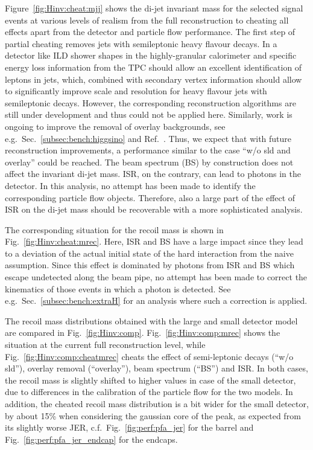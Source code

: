 Figure~\ref{fig:Hinv:cheat:mjj} shows the di-jet invariant mass for the selected signal events at various levels of realism from the full reconstruction to cheating all effects apart from the detector and particle flow performance. The first step of partial cheating removes jets with semileptonic heavy flavour decays. In a detector like ILD shower shapes in the highly-granular calorimeter and specific energy loss information from the TPC should allow an
excellent identification of leptons in jets, which, combined with secondary vertex information
should allow to significantly improve scale and resolution for heavy flavour jets with semileptonic decays. However, the corresponding reconstruction algorithms are still under development and thus could not be applied here. Similarly, work is ongoing to improve the
removal of overlay backgrounds, see e.g.\ Sec.~\ref{subsec:bench:higgsino} and Ref.~\cite{Boronat:2014hva}. Thus, we expect that with future reconstruction improvements, a performance similar to the case ``w/o sld and overlay'' could be reached. The beam spectrum (BS) by construction does not affect the invariant di-jet mass. ISR, on the contrary, can lead to photons in the detector. In this analysis, no attempt has been made to identify the corresponding particle flow objects. Therefore, also a large part of the effect of ISR on the di-jet mass should be recoverable with a more sophisticated analysis. 

The corresponding situation for the recoil mass is shown in Fig.~\ref{fig:Hinv:cheat:mrec}.
Here, ISR and BS have a large impact since they lead to a deviation of the actual initial state of the hard interaction from the naive assumption. Since this effect is dominated by photons from ISR and BS which escape undetected along the beam pipe, no attempt has been made to correct the kinematics of those events in which a photon is detected. See e.g.\ Sec.~\ref{subsec:bench:extraH} for an analysis where such a correction is applied. 

The recoil mass distributions obtained with the large and small detector model are compared in Fig.~\ref{fig:Hinv:comp}. Fig.~\ref{fig:Hinv:comp:mrec} shows the situation at the current full reconstruction level, while Fig.~\ref{fig:Hinv:comp:cheatmrec} cheats the effect of semi-leptonic decays (``w/o sld''), overlay removal (``overlay''), beam spectrum (``BS'') and ISR. In both cases, the recoil  mass is slightly shifted to higher values in case of the small detector, due to differences 
in the calibration of the particle flow for the two models. In addition, the cheated recoil mass distribution is a bit wider for the small detector, by about 15\% when considering the gaussian core of the peak, as expected from its slightly worse
JER, c.f.\ Fig.~\ref{fig:perf:pfa_jer} for the barrel and Fig.~\ref{fig:perf:pfa_jer_endcap} for the endcaps.

